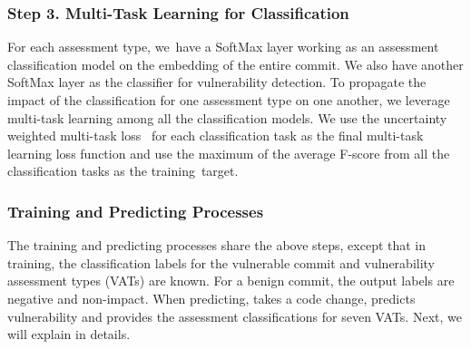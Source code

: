 
\subsubsection*{{\bf Step 3. Multi-Task Learning for Classification}}

For each assessment type, we~have a SoftMax layer working as an
assessment classification model on the embedding of the entire commit.
We also have another SoftMax layer as the classifier for
vulnerability detection.
%
%
To propagate the impact of the classification for one assessment type
on one another, we leverage multi-task learning among all the
classification models. We use the uncertainty weighted multi-task
loss~\cite{kendall2018multi} for each classification task as the final
multi-task learning loss function and use the maximum of the average
F-score from all the classification tasks as the training~target.




\subsubsection*{{\bf Training and Predicting Processes}}
The training and predicting processes share the above steps, except
that in training, the classification labels for the vulnerable commit
and vulnerability assessment types (VATs) are known. For a benign
commit, the output labels are negative and non-impact.
When predicting, {\tool} takes a code change, predicts
vulnerability and provides the assessment classifications for seven
VATs. Next, we will explain {\tool} in details.



